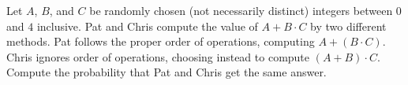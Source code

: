 Let $A$, $B$, and $C$ be randomly chosen (not necessarily distinct) integers between $0$ and $4$ inclusive. Pat and Chris compute the value of $A+B\cdot C$ by two different methods. Pat follows the proper order of operations, computing $A+\left(B\cdot C\right)$. Chris ignores order of operations, choosing instead to compute $\left(A+B\right)\cdot C$. Compute the probability that Pat and Chris get the same answer.